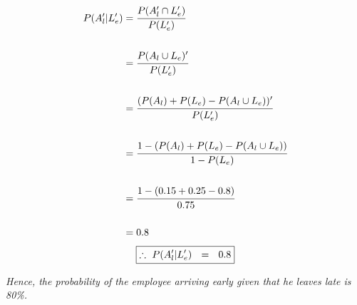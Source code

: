 \documentclass{article}
\begin{document}
\begin{enumerate}
  \begin{align*}
    P(A_l' |  L_e') &= \cfrac{P(A_l' \cap L_e')}{P(L_e')}\\\\
    & = \cfrac{P(A_l \cup L_e)'}{P(L_e')}\\\\
    & = \cfrac{(P(A_l) + P(L_e) - P(A_l \cup L_e))'}{P(L_e')}\\\\
    & = \cfrac{1-(P(A_l) + P(L_e) - P(A_l \cup L_e))}{1 - P(L_e)}\\\\
    & = \cfrac{1 - (0.15 + 0.25 - 0.8)}{0.75}\\\\
    & = 0.8\\
  \end{align*}
  \[
     \boxed{\therefore\ P(A_l' |  L_e')\ \ = \ \ 0.8}\\
  \]

  \textit{Hence, the probability of the employee arriving early given that he leaves late is 80\%.}\\\\


\end{enumerate}
\end{document}
